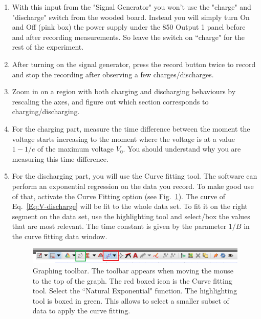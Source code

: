 \documentclass[12pt]{report}
\begin{document}
\begin{enumerate}
\item With this input from the "Signal Generator" you won't use the "charge" and "discharge" switch from the wooded board. Instead you will simply turn On and Off (pink box) the power supply under the 850 Output 1 panel before and after recording measurements. So leave the switch on ``charge" for the rest of the experiment.
\item After turning on the signal generator, press the record button twice to record and stop the recording after observing a few charges/discharges.
\item Zoom in on a region with both charging and discharging behaviours by rescaling the axes, and figure out which section corresponds to charging/discharging.
\item For the charging part, measure the time difference between the moment the voltage starts increasing to the moment where the voltage is at a value $1-1/e$ of the maximum voltage $V_0$. You should understand why you are measuring this time difference.
\item For the discharging part, you will use the Curve fitting tool. The software can perform an exponential regression on the data you record. To make good use of that, activate the Curve Fitting option (see Fig.~\ref{Fig:lab2-interface-graph}). The curve of Eq.~\eqref{Eq:V-discharge} will be fit to the whole data set. To fit it on the right segment on the data set, use the highlighting tool and select/box the values that are most relevant. The time constant is given by the parameter $1/B$ in the curve fitting data window.
\begin{figure}[h]
\centering
\includegraphics[width=0.9 \linewidth]{lab2-interface-graph-tools}
\caption{Graphing toolbar. The toolbar appears when moving the mouse to the top of the graph. The red boxed icon is the Curve fitting tool. Select the ``Natural Exponential" function. The highlighting tool is boxed in green. This allows to select a smaller subset of data to apply the curve fitting.}
\label{Fig:lab2-interface-graph}
\end{figure}


\end{enumerate}
\end{document}

